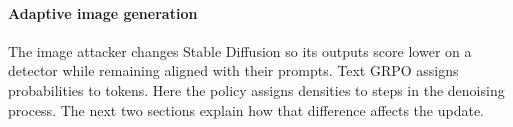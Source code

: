 \paragraph{Adaptive image generation}
The image attacker changes Stable Diffusion so its outputs score lower on a detector while remaining aligned with their prompts. Text GRPO assigns probabilities to tokens. Here the policy assigns densities to steps in the denoising process. The next two sections explain how that difference affects the update.
